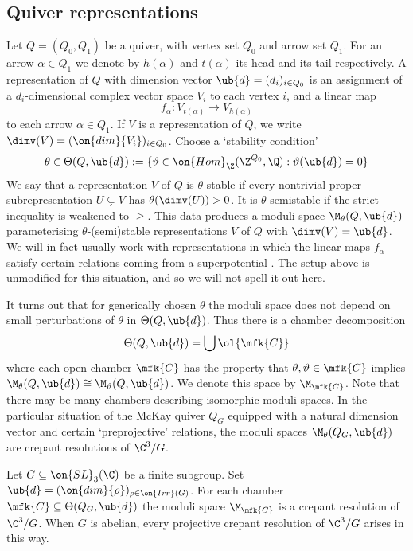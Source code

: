 \documentclass[leqno,11pt,a4paper]{amsart}
\begin{document}
\subsection{Quiver representations}

Let $Q=(Q_0,Q_1)$ be a quiver, with vertex set $Q_0$ and arrow set $Q_1$. For an arrow $\alpha\in Q_1$ we denote by $h(\alpha)$ and $t(\alpha)$ its head and its tail respectively. A representation of $Q$ with dimension vector $\ub{d}=(d_i)_{i\in Q_0}$ is an assignment of a $d_i$-dimensional complex vector space $V_i$ to each vertex $i$, and a linear map
$$f_\alpha\colon V_{t(\alpha)}\to V_{h(\alpha)}$$
to each arrow $\alpha\in Q_1$. If $V$ is a representation of $Q$, we write $\dimv(V)=(\on{dim}{V_i})_{i\in Q_0}$. Choose a `stability condition'
$$\theta\in\Theta(Q,\ub{d}):=\{\vartheta\in\on{Hom}_\Z(\Z^{Q_0},\Q):\vartheta(\ub{d})=0\}$$
We say that a representation $V$ of $Q$ is $\theta$-stable if every nontrivial proper subrepresentation $U\subsetneq V$ has $\theta(\dimv(U))>0$. It is $\theta$-semistable if the strict inequality is weakened to $\geq$.
This data produces a moduli space $\M_\theta(Q,\ub{d})$ parameterising $\theta$-(semi)stable representations $V$ of $Q$ with $\dimv(V)=\ub{d}$. We will in fact usually work with representations in which the linear maps $f_\alpha$ satisfy certain relations coming from a superpotential \cite{bsw_sup_10}. The setup above is unmodified for this situation, and so we will not spell it out here.

It turns out that for generically chosen $\theta$ the moduli space does not depend on small perturbations of $\theta$ in $\Theta(Q,\ub{d})$. Thus there is a chamber decomposition
$$\Theta(Q,\ub{d})=\bigcup\ol{\mfk{C}}$$
where each open chamber $\mfk{C}$ has the property that $\theta,\vartheta\in\mfk{C}$ implies $\M_\theta(Q,\ub{d})\cong\M_\vartheta(Q,\ub{d})$. We denote this space by $\M_\mfk{C}$. Note that there may be many chambers describing isomorphic moduli spaces. In the particular situation of the McKay quiver $Q_G$ equipped with a natural dimension vector and certain `preprojective' relations, the moduli spaces $\M_\theta(Q_G,\ub{d})$ are crepant resolutions of $\C^3/G$.

\begin{thm} Let $G\subseteq\on{SL}_3(\C)$ be a finite subgroup. Set $\ub{d}=(\on{dim}{\rho})_{\rho\in\on{Irr}(G)}$. For each chamber $\mfk{C}\subseteq\Theta(Q_G,\ub{d})$ the moduli space $\M_\mfk{C}$ is a crepant resolution of $\C^3/G$. When $G$ is abelian, every projective crepant resolution of $\C^3/G$ arises in this way.
\end{thm}
\end{document}
